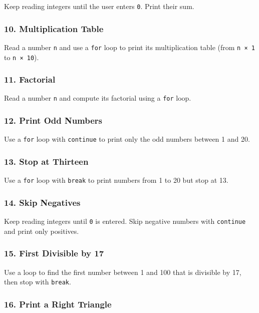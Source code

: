 \documentclass[
  letterpaper,
  DIV=11,
  numbers=noendperiod]{scrreprt}
\begin{document}
Keep reading integers until the user enters \texttt{0}. Print their sum.

\subsubsection{10. Multiplication Table}\label{multiplication-table}

Read a number \texttt{n} and use a \texttt{for} loop to print its
multiplication table (from \texttt{n\ ×\ 1} to \texttt{n\ ×\ 10}).

\subsubsection{11. Factorial}\label{factorial}

Read a number \texttt{n} and compute its factorial using a \texttt{for}
loop.

\subsubsection{12. Print Odd Numbers}\label{print-odd-numbers}

Use a \texttt{for} loop with \texttt{continue} to print only the odd
numbers between 1 and 20.

\subsubsection{13. Stop at Thirteen}\label{stop-at-thirteen}

Use a \texttt{for} loop with \texttt{break} to print numbers from 1 to
20 but stop at 13.

\subsubsection{14. Skip Negatives}\label{skip-negatives}

Keep reading integers until \texttt{0} is entered. Skip negative numbers
with \texttt{continue} and print only positives.

\subsubsection{15. First Divisible by 17}\label{first-divisible-by-17}

Use a loop to find the first number between 1 and 100 that is divisible
by 17, then stop with \texttt{break}.

\subsubsection{16. Print a Right Triangle}\label{print-a-right-triangle}
\end{document}
